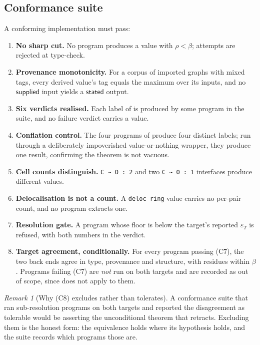 \documentclass[11pt,twocolumn,a4paper]{article}
\theoremstyle{thmstyle}
\theoremstyle{definition}
\theoremstyle{remark}
\newtheorem{remark}[theorem]{Remark}
\newcommand{\flo}{\beta}
\newcommand{\res}{\rho}
\newcommand{\hj}[1]{\texttt{#1}}
\newcommand{\stated}{\textsf{stated}}
\newcommand{\supplied}{\textsf{supplied}}
\newcommand{\eps}{\varepsilon}
\begin{document}
\subsection{Conformance suite}

A conforming implementation must pass:

\begin{enumerate}[label=(C\arabic*),leftmargin=3em,itemsep=2pt]
\item \textbf{No sharp cut.} No program produces a value with
$\res<\flo$; attempts are rejected at type-check.
\item \textbf{Provenance monotonicity.} For a corpus of imported graphs
with mixed tags, every derived value's tag equals the maximum over its
inputs, and no $\supplied$ input yields a $\stated$ output.
\item \textbf{Six verdicts realised.} Each label of  is
produced by some program in the suite, and no failure verdict carries a
value.
\item \textbf{Conflation control.} The four programs of
 produce four distinct labels; run through a
deliberately impoverished value-or-nothing wrapper, they produce one
result, confirming the theorem is not vacuous.
\item \textbf{Cell counts distinguish.} \hj{C \~{} O : 2} and two
\hj{C \~{} O : 1} interfaces produce different values.
\item \textbf{Delocalisation is not a count.} A \hj{deloc ring} value
carries no per-pair count, and no program extracts one.
\item \textbf{Resolution gate.} A program whose floor is below the
target's reported $\eps_T$ is refused, with both numbers in the verdict.
\item \textbf{Target agreement, conditionally.} For every program passing
(C7), the two back ends agree in type, provenance and structure, with
residues within $\flo$. Programs failing (C7) are \emph{not} run on both
targets and are recorded as out of scope, since
 does not apply to them.
\end{enumerate}

\begin{remark}[Why (C8) excludes rather than tolerates]
\label{rem:c8}
A conformance suite that ran sub-resolution programs on both targets and
reported the disagreement as tolerable would be asserting the unconditional
theorem that  retracts. Excluding them is the
honest form: the equivalence holds where its hypothesis holds, and the
suite records which programs those are.
\end{remark}
\end{document}
